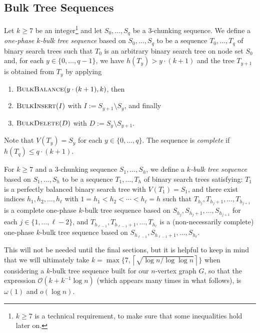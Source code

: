 \documentclass[kpfonts]{patmorin}
\newcommand{\Oh}{\mathcal{O}}
\let\ge\geqslant
\let\leq\leqslant
\let\geq\geqslant
\begin{document}
\subsection{Bulk Tree Sequences}



Let $k\ge 7$ be an integer\footnote{$k \geq 7$ is a technical requirement, to make sure that some inequalities hold later on.} and let $S_0,\ldots,S_q$ be a $3$-chunking sequence.
We define a \emph{one-phase $k$-bulk tree sequence} based on $S_0,\ldots,S_q$ to be a sequence $T_0, \dots, T_{q}$ of binary search trees such that $T_0$ is an arbitrary binary search tree on node set $S_0$ and,  for each $y\in \{0, \dots, q-1\}$, we have $h(T_y)>y\cdot(k+1)$ and
the tree $T_{y+1}$ is obtained from $T_y$ by applying
\begin{enumerate}[label={(\roman*)}, ref={\roman*}, noitemsep]
    \item $\textsc{BulkBalance}(y\cdot(k+1),k)$, then
    \item $\textsc{BulkInsert}(I)$ with $I:=S_{y+1} \setminus S_{y}$, and finally
    \item $\textsc{BulkDelete}(D)$ with $D:=S_{y} \setminus S_{y+1}$.
\end{enumerate}
Note that $V(T_y)=S_y$ for each $y \in \{0, \dots, q\}$.
The sequence is \emph{complete} if $h(T_q)\leq q\cdot(k+1)$.

For $k\geq 7$ and a $3$-chunking sequence $S_1,\ldots,S_h$, we define
a \emph{$k$-bulk tree sequence} based on $S_1,\ldots,S_h$ to be a sequence $T_1, \dots, T_h$ of binary search trees satisfying:
$T_1$ is a perfectly balanced binary search tree with $V(T_1)=S_1$, and
there exist indices $h_1,h_2,\ldots,h_{\ell}$ with $1=h_1 < h_2 < \cdots <h_{\ell} = h$  such that $T_{h_j}, T_{h_j+1},\ldots,T_{h_{j+1}}$ is a complete one-phase $k$-bulk tree sequence based on $S_{h_j}, S_{h_j+1},\ldots,S_{h_{j+1}}$
for each $j\in\{1,\ldots,\ell-2\}$, and $T_{h_{\ell-1}}, T_{h_{\ell-1}+1},\ldots,T_{h_{\ell}}$ is a (non-necessarily complete) one-phase $k$-bulk tree sequence based on $S_{h_{\ell-1}},S_{h_{\ell-1}+1},\ldots,S_{h_{\ell}}$.


This will not be needed until the final sections, but it is helpful to keep in mind that we will ultimately take $k=\max\{7,\left\lceil\sqrt{\log n / \log\log n}\right\rceil\}$ when considering a $k$-bulk tree sequence built for our $n$-vertex graph $G$, so that the expression $\Oh(k+k^{-1}\log n)$ (which appears many times in what follows), is $\omega(1)$ and $o(\log n)$.
\end{document}
